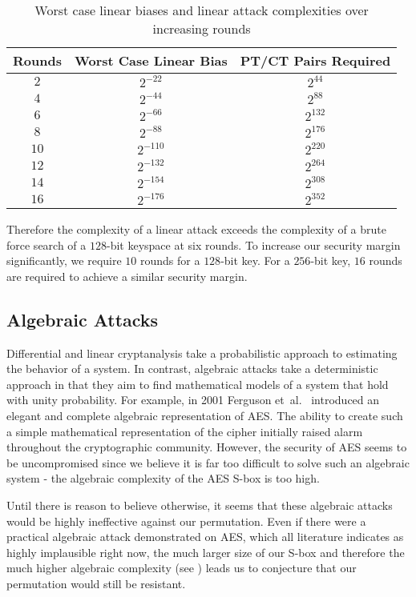\begin{table}[ht]
\centering
\begin{tabular}{c|c|c}
Rounds & Worst Case Linear Bias & PT/CT Pairs Required \\
\hline
$2$  & $2^{-22}$  & $2^{44}$  \\
$4$  & $2^{-44}$  & $2^{88}$  \\
$6$  & $2^{-66}$  & $2^{132}$ \\
$8$  & $2^{-88}$  & $2^{176}$ \\
$10$ & $2^{-110}$ & $2^{220}$ \\
$12$ & $2^{-132}$ & $2^{264}$ \\
$14$ & $2^{-154}$ & $2^{308}$ \\
$16$ & $2^{-176}$ & $2^{352}$ \\
\end{tabular}
\caption{Worst case linear biases and linear attack complexities over increasing rounds}
\label{tab:LinearBiases}
\end{table}

Therefore the complexity of a linear attack exceeds the complexity of a brute force search of a $128$-bit keyspace at six rounds.
To increase our security margin significantly, we require $10$ rounds for a $128$-bit key.
For a $256$-bit key, $16$ rounds are required to achieve a similar security margin.

\subsection{Algebraic Attacks}
Differential and linear cryptanalysis take a probabilistic approach to estimating the behavior of a system.
In contrast, algebraic attacks take a deterministic approach in that they aim to find mathematical models of a system that hold with unity probability.
For example, in 2001 Ferguson et~al.\ \cite{Ferguson2001_AlgebraicRijndael} introduced an elegant and complete algebraic representation of AES.
The ability to create such a simple mathematical representation of the cipher initially raised alarm throughout the cryptographic community.
However, the security of AES seems to be uncompromised since we believe it is far too difficult to solve such an algebraic system - the algebraic complexity of the AES S-box is too high.

Until there is reason to believe otherwise, it seems that these algebraic attacks would be highly ineffective against our permutation.
Even if there were a practical algebraic attack demonstrated on AES, which all literature indicates as highly implausible right now, the much larger size of our S-box and therefore the much higher algebraic complexity (see \cite{Wood2013_SboxThesis}) leads us to conjecture that our permutation would still be resistant.

